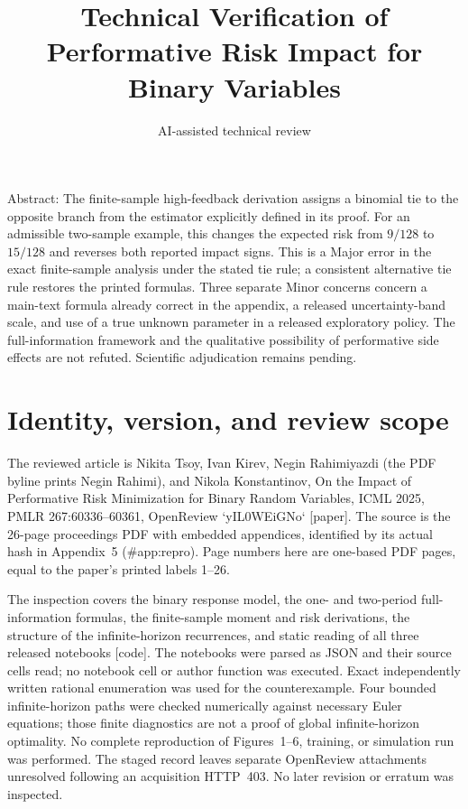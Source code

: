 \documentclass[10pt]{article}
\title{Technical Verification of
Performative Risk Impact for Binary Variables}
\author{AI-assisted technical review}
\date{}
\begin{document}
\maketitle
Abstract: The finite-sample high-feedback derivation assigns a binomial tie to the opposite branch from the estimator explicitly defined in its proof. For an admissible two-sample example, this changes the expected risk from \(9/128\) to \(15/128\) and reverses both reported impact signs. This is a Major error in the exact finite-sample analysis under the stated tie rule; a consistent alternative tie rule restores the printed formulas. Three separate Minor concerns concern a main-text formula already correct in the appendix, a released uncertainty-band scale, and use of a true unknown parameter in a released exploratory policy. The full-information framework and the qualitative possibility of performative side effects are not refuted. Scientific adjudication remains pending.\par
\section*{Identity, version, and review scope}
The reviewed article is Nikita Tsoy, Ivan Kirev, Negin Rahimiyazdi (the PDF byline prints Negin Rahimi), and Nikola Konstantinov, On the Impact of Performative Risk Minimization for Binary Random Variables, ICML 2025, PMLR 267:60336–60361, OpenReview `yIL0WEiGNo` [paper]. The source is the 26-page proceedings PDF with embedded appendices, identified by its actual hash in Appendix 5 (\#app:repro). Page numbers here are one-based PDF pages, equal to the paper’s printed labels 1–26.\par
The inspection covers the binary response model, the one- and two-period full-information formulas, the finite-sample moment and risk derivations, the structure of the infinite-horizon recurrences, and static reading of all three released notebooks [code]. The notebooks were parsed as JSON and their source cells read; no notebook cell or author function was executed. Exact independently written rational enumeration was used for the counterexample. Four bounded infinite-horizon paths were checked numerically against necessary Euler equations; those finite diagnostics are not a proof of global infinite-horizon optimality. No complete reproduction of Figures 1–6, training, or simulation run was performed. The staged record leaves separate OpenReview attachments unresolved following an acquisition HTTP 403. No later revision or erratum was inspected.\par
\end{document}
